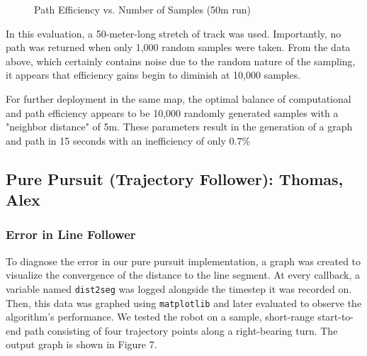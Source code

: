 \documentclass{article}
\begin{document}
\begin{figure}[H]
    \centering
    \caption{Path Efficiency vs. Number of Samples (50m run)}
    \label{fig:error_vs_samples}
\end{figure}

In this evaluation, a 50-meter-long stretch of track was used. Importantly, no path was returned when only 1,000 random samples were taken. From the data above, which certainly contains noise due to the random nature of the sampling, it appears that efficiency gains begin to diminish at 10,000 samples.

For further deployment in the same map, the optimal balance of computational and path efficiency appears to be 10,000 randomly generated samples with a "neighbor distance" of 5m. These parameters result in the generation of a graph and path in 15 seconds with an inefficiency of only $0.7\%$

\subsection{Pure Pursuit (Trajectory Follower): Thomas, Alex}
\subsubsection{Error in Line Follower}
To diagnose the error in our pure pursuit implementation, a graph was created to visualize the convergence of the distance to the line segment. At every callback, a variable named \texttt{dist2seg} was logged alongside the timestep it was recorded on. Then, this data was graphed using \texttt{matplotlib} and later evaluated to observe the algorithm's performance. We tested the robot on a sample, short-range start-to-end path consisting of four trajectory points along a right-bearing turn. The output graph is shown in Figure 7. 
\end{document}

